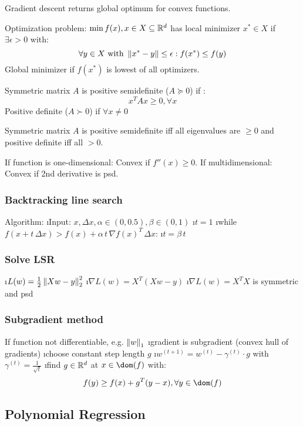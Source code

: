 Gradient descent returns global optimum for convex functions.

Optimization problem: $\min f(x), x \in X \subseteq \mathbb{R}^d$ has local minimizer $x^* \in X$ if $\exists \epsilon > 0$ with:
\[\forall y \in X \text{ with } \left\lVert x^* - y\right\rVert \leq \epsilon: f(x^*) \leq f(y)\]
Global minimizer if $f(x^*)$ is lowest of all optimizers.

Symmetric matrix $A$ is positive semidefinite ($A \succcurlyeq 0$) if :
\[x^TAx \geq 0, \forall x\]
Positive definite ($A \succ 0$) if $\forall x \neq 0$

Symmetric matrix $A$ is positive semidefinite iff all eigenvalues are $\geq 0$ and positive definite iff all $> 0$.

If function is one-dimensional: Convex if $f''(x) \geq 0$.
If multidimensional: Convex if 2nd derivative is psd.


\subsubsection{Backtracking line search} %

Algorithm:
\be
\i Input: $x, \Delta x, \alpha \in (0,0.5), \beta \in (0,1)$
\i $t = 1$
\i while $f(x + t \, \Delta x) > f(x) + \alpha \, t \, \nabla f(x)^T \, \Delta x$:
\i \quad $t = \beta \, t$
\ee

\subsubsection{Solve LSR}

\be
\i $L(w) = \frac{1}{2} \left\lVert Xw-y\right\rVert_2^2$
\i $\nabla L(w) = X^T(Xw-y)$
\i $\nabla L(w) = X^TX$ is symmetric and psd
\ee

\subsubsection{Subgradient method} %

If function not differentiable, e.g. $\left\lVert w\right\rVert_1$
\bi
\i gradient is subgradient (convex hull of gradients)
\i choose constant step length $g$
\i $w^{(t+1)} = w^{(t)} - \gamma^{(t)} \cdot g$ with $\gamma^{(t)} = \frac{1}{\sqrt{t}}$
\i find $g \in \mathbb{R}^d$ at $x \in \dom(f)$ with: \[f(y) \geq f(x) + g^T(y-x), \forall y \in \dom(f)\]
\ei

\subsection{Polynomial Regression}

